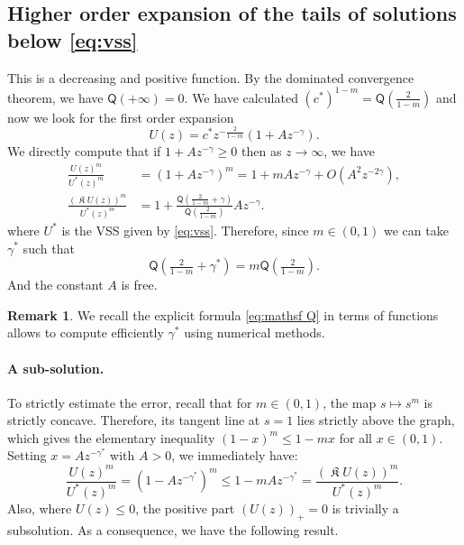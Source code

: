 \documentclass[a4paper]{article}
\theoremstyle{definition}
\newtheorem{remark}[theorem]{Remark}
\DeclareMathOperator{\fixedpoint}{\mathfrak K}
\begin{document}
\subsection{Higher order expansion of the tails of solutions below \eqref{eq:vss}}

This is a decreasing and positive function.
By the dominated convergence theorem, we have $\mathsf Q(+\infty) = 0$. We have calculated $(c^*)^{1-m} = \mathsf Q(\frac{2}{1-m})$ and now we look for the first order expansion
\[
U(z) = c^* z^{-\frac 2 {1-m}} ( 1 + A z^{-\gamma} ).
\]
We directly compute that if $1 + Az^{-\gamma} \ge 0$ then as $z\rightarrow \infty$, we have\normalcolor
\begin{align*}
\frac{U(z)^m}{U^*(z)^m}                & = (1 + Az^{-\gamma})^m = 1 + m A z ^{-\gamma} + {{O(A^2z^{-2\gamma})}},
\\
\frac{(\fixedpoint U(z))^m}{U^* (z)^m} & = 1 + \frac{\mathsf Q(\frac{2}{1-m}+\gamma)}{\mathsf Q(\frac{2}{1-m})} A z^{-\gamma}.
\end{align*}
where $U^*$ is the VSS given by \eqref{eq:vss}.
%
Therefore, since $m \in (0,1)$ we can take $\gamma^*$ such that
\begin{equation}
\label{eq:gamma^star}
\mathsf Q\left(\tfrac{2}{1-m}+\gamma^*\right) = m \mathsf Q\left(\tfrac{2}{1-m}\right).
\end{equation}
And the constant $A$ is free.

\begin{remark}
We recall the explicit formula \eqref{eq:mathsf Q} in terms of functions allows to compute efficiently $\gamma^*$ using numerical methods.
\end{remark}

\paragraph{A sub-solution.}
%
%
%
%
%
%
%
%
%
%
%

%
To strictly estimate the error, recall that for $m \in (0,1)$, the map $s \mapsto s^m$ is strictly concave. Therefore, its tangent line at $s=1$ lies strictly above the graph, which gives the elementary inequality $(1-x)^m \le 1 - mx$ for all $x \in (0,1)$.
Setting $x = A z^{-\gamma^*}$ with $A > 0$, we immediately have:
\begin{equation*}
\frac{U(z)^m}{U^*(z)^m} = (1 - A z^{-\gamma^*})^m \le 1 - m A z^{-\gamma^*} = \frac{(\fixedpoint U(z))^m}{U^* (z)^m}.
\end{equation*}
Also, where $U(z) \le 0$, the positive part $(U(z))_+ = 0$ is trivially a subsolution. As a consequence, we have the following result.
\end{document}
